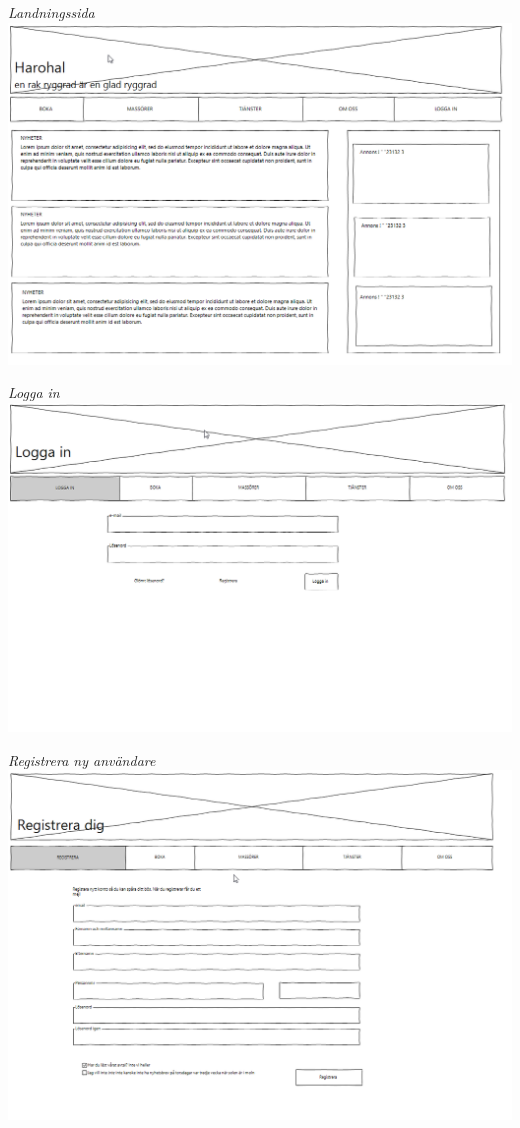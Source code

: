 \documentclass[11pt, titlepage, oneside, a4paper]{article}	%
\begin{document}
\begin{center}  	
  	\textit{Landningssida}
    \includegraphics[width=1\textwidth]{../Bilder/Wireframe/hem}
    
    \textit{Logga in}
    \includegraphics[width=1\textwidth]{../Bilder/Wireframe/logga_in}
    \newpage
    
    \textit{Registrera ny användare}
    \includegraphics[width=1\textwidth]{../Bilder/Wireframe/registrera}
    

\end{center}
\end{document}
